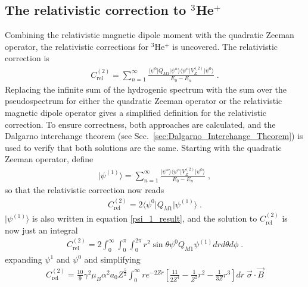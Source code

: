         \subsection{The relativistic correction to $^3$He$^+$}\label{sec:Relativistic_Correction}
            Combining the relativistic magnetic dipole moment with the quadratic Zeeman operator, the relativistic corrections for $^3$He$^+$ is uncovered. The relativistic correction is
            \begin{align}
                C_{\text{rel}}^{(2)} = \sum_{n = 1}^\infty \frac{\langle \psi^0 \vert Q_{M1} \vert \psi^n \rangle \langle \psi^n\vert V_Z^{(2)} \vert \psi^0 \rangle}{E_0 - E_n}\;.
            \end{align}
            \noindent Replacing the infinite sum of the hydrogenic spectrum with the sum over the pseudospectrum for either the quadratic Zeeman operator or the relativistic magnetic dipole operator gives a simplified definition for the relativistic correction. To ensure correctness, both approaches are calculated, and the Dalgarno interchange theorem (see Sec.~\ref{sec:Dalgarno_Interchange_Theorem}) is used to verify that both solutions are the same. Starting with the quadratic Zeeman operator, define 
            \begin{align}
                \vert \psi^{(1)} \rangle = \sum_{n = 1}^\infty \frac{\vert \psi^n \rangle \langle \psi^n \vert V_Z^{(2)} \vert \psi^0 \rangle}{E_0 - E_n}\;,
            \end{align}
            \noindent so that the relativistic correction now reads 
            \begin{align}
                C_{\text{rel}}^{(2)} = 2\langle \psi^0 \vert Q_{M1} \vert \psi^{(1)} \rangle\;.
            \end{align}
            \noindent $\vert \psi^{(1)} \rangle$ is also written in equation \eqref{psi_1_result}, and the solution to $C_{\text{rel}}^{(2)}$ is now just an integral 
            \begin{align}
                C_{\text{rel}}^{(2)} = 2\int_0^\infty \int_0^\pi \int_0^{2\pi} r^2 \sin\theta \psi^0 Q_{M1} \psi^{(1)} dr d\theta d\phi\;.
            \end{align}
            \noindent expanding $\psi^1$ and $\psi^0$ and simplifying
            \begin{align}
                C_{\text{rel}}^{(2)} = \frac{10}{9} \gamma^2 \mu_B \alpha^2 a_0 Z^{\frac{5}{2}} \int_0^\infty r e^{-2Zr} \left[ \frac{11}{2Z^4} - \frac{1}{Z^2}r^2 - \frac{1}{3Z} r^3 \right] dr \; \vec{\sigma} \cdot \vec{B}
            \end{align}

